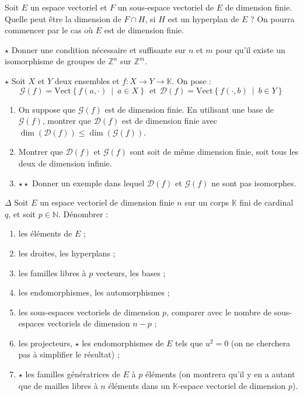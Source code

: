 \documentclass[french,a4paper]{article}
\newcommand{\N}{\mathbb{N}}
\newcommand{\Z}{\mathbb{Z}}
\newcommand{\K}{\mathbb{K}}
\theoremstyle{plain}
\theoremstyle{definition}
\theoremstyle{remark}
\begin{document}
\begin{ex}[Moulin.22]{}
	Soit $E$ un espace vectoriel et $F$ un sous-espace vectoriel de $E$ de dimension finie. Quelle peut être la dimension de $F\cap H$, si $H$ est un hyperplan de $E$ ? On pourra commencer par le cas où $E$ est de dimension finie.
\end{ex}

\begin{ex}[Moulin.23]{$\star$}
	Donner une condition nécessaire et suffisante sur $n$ et $m$ pour qu'il existe un isomorphisme de groupes de $\Z^n$ sur $\Z^m$.
\end{ex}

\begin{ex}[Moulin.24]{$\star$}
	Soit $X$ et $Y$ deux ensembles et $f:X\to Y\to\K$. On pose : $$\mathcal{G}(f)=\text{Vect}\left\{f(a,\cdot)\ \mid\ a\in X\right\}\ \ \text{et}\ \ \mathcal{D}(f)=\text{Vect}\left\{f(\cdot,b)\ \mid\ b\in Y\right\}$$
	\begin{enumerate}
		\item On suppose que $\mathcal{G}(f)$ est de dimension finie. En utilisant une base de $\mathcal{G}(f)$, montrer que $\mathcal{D}(f)$ est de dimension finie avec $\dim(\mathcal{D}(f))\leqslant\dim(\mathcal{G}(f))$.
		\item Montrer que $\mathcal{D}(f)$ et $\mathcal{G}(f)$ sont soit de même dimension finie, soit tous les deux de dimension infinie.
		\item $\star\star$ Donner un exemple dans lequel $\mathcal{D}(f)$ et $\mathcal{G}(f)$ ne sont pas isomorphes.
	\end{enumerate}
\end{ex}

\begin{ex}[Moulin.25]{$\Delta$}
	Soit $E$ un espace vectoriel de dimension finie $n$ sur un corps $\K$ fini de cardinal $q$, et soit $p\in\N$. Dénombrer :
	\begin{enumerate}
		\item les éléments de $E$ ;
		\item les droites, les hyperplans ;
		\item les familles libres à $p$ vecteurs, les bases ;
		\item les endomorphismes, les automorphismes ;
		\item les sous-espaces vectoriels de dimension $p$, comparer avec le nombre de sous-espaces vectoriels de dimension $n-p$ ;
		\item les projecteurs, $\star$ les endomorphismes de $E$ tels que $u^2=0$ (on ne cherchera pas à simplifier le résultat) ;
		\item $\star$ les familles génératrices de $E$ à $p$ éléments (on montrera qu'il y en a autant que de mailles libres à $n$ éléments dans un $\K$-espace vectoriel de dimension $p$).
	\end{enumerate}
\end{ex}
\end{document}
